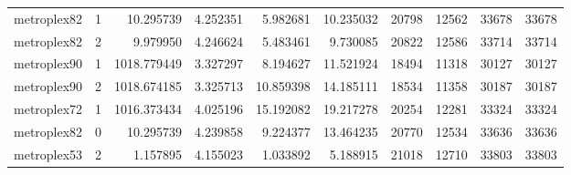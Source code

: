\begin{longtable}{|l|r|r|r|r|r|r|r|r|r|}
metroplex82 & 1 & 10.295739 & 4.252351 & 5.982681 & 10.235032 & 20798 & 12562 & 33678 & 33678 \\
metroplex82 & 2 & 9.979950 & 4.246624 & 5.483461 & 9.730085 & 20822 & 12586 & 33714 & 33714 \\
metroplex90 & 1 & 1018.779449 & 3.327297 & 8.194627 & 11.521924 & 18494 & 11318 & 30127 & 30127 \\
metroplex90 & 2 & 1018.674185 & 3.325713 & 10.859398 & 14.185111 & 18534 & 11358 & 30187 & 30187 \\
metroplex72 & 1 & 1016.373434 & 4.025196 & 15.192082 & 19.217278 & 20254 & 12281 & 33324 & 33324 \\
metroplex82 & 0 & 10.295739 & 4.239858 & 9.224377 & 13.464235 & 20770 & 12534 & 33636 & 33636 \\
metroplex53 & 2 & 1.157895 & 4.155023 & 1.033892 & 5.188915 & 21018 & 12710 & 33803 & 33803 \\
\end{longtable}
